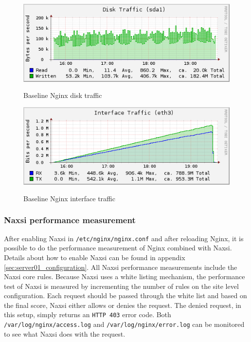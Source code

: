 \documentclass[Measurements]{subfiles}
\begin{document}
\begin{figure}[H]
\centering
\caption{Baseline Nginx disk traffic}
\includegraphics[scale=0.7]{images/results/baseline/disk.png}
\label{fig:Baseline Nginx disk traffic}
\end{figure}

\begin{figure}[H]
\centering
\caption{Baseline Nginx interface traffic}
\includegraphics[scale=0.7]{images/results/baseline/interface.png}
\label{fig:Baseline Nginx interface traffic}
\end{figure}

\subsubsection{Naxsi performance measurement}

After enabling Naxsi in \verb+/etc/nginx/nginx.conf+ and after reloading Nginx, it is possible to do the performance measurement of Nginx combined with Naxsi. Details about how to enable Naxsi can be found in appendix \ref{sec:server01_configuration}. All Naxsi performance measurements include the Naxsi core rules. Because Naxsi uses a white listing mechanism, the performance test of Naxsi is measured by incrementing the number of rules on the site level configuration. Each request should be passed through the white list and based on the final score, Naxsi either allows or denies the request. The denied request, in this setup, simply returns an \verb+HTTP 403+ error code. Both \verb+/var/log/nginx/access.log+ and \verb+/var/log/nginx/error.log+ can be monitored to see what Naxsi does with the request.
\end{document}
